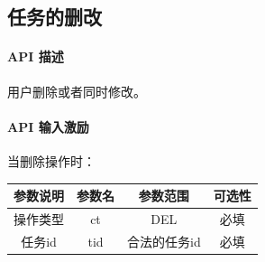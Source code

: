 \documentclass[UTF8]{article}
\def\apiintr{\paragraph{\colorbox[rgb]{1.0,0.6,0.65}{API 描述}}} %
\def\apiexc{\paragraph{\colorbox[rgb]{1,0.85,0.45}{API 输入激励}}} %
\begin{document}
    \subsection{任务的删改}
    \apiintr
    用户删除或者同时修改。
    \apiexc 当删除操作时：\\
    \begin{tabular}{|c|c|c|c|}
        \hline \rule[-2ex]{0pt}{5.5ex} 参数说明 & 参数名 & 参数范围 & 可选性 \\
        \hline \rule[-2ex]{0pt}{5.5ex} 操作类型 & ct & DEL & 必填 \\
        \hline \rule[-2ex]{0pt}{5.5ex} 任务id & tid & 合法的任务id & 必填 \\
        \hline 
    \end{tabular}
    
\end{document}
